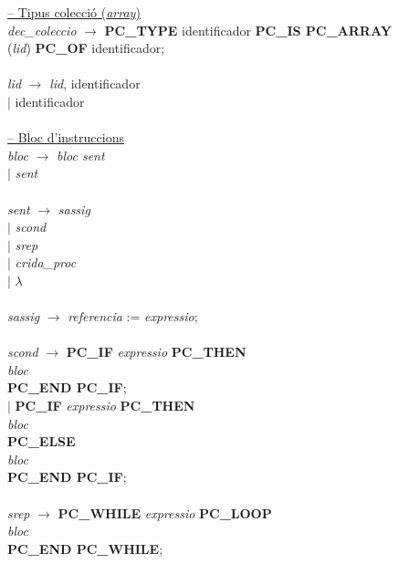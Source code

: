 \begin{tabbing}
        \underline{-- Tipus colecció (\textit{array})} \\
        \textit{dec\_coleccio} \> $\rightarrow$ \> \textbf{PC\_TYPE} identificador \textbf{PC\_IS PC\_ARRAY} \\
		\> (\textit{lid}) \textbf{PC\_OF} identificador; \\
        \\
        \textit{lid} \> $\rightarrow$ \> \textit{lid}, identificador \\
        \> $\mid$ \> identificador \\
        \\
        
        
        \underline{-- Bloc d'instruccions} \\
        \textit{bloc} \> $\rightarrow$ \> \textit{bloc sent} \\
        \> $\mid$ \> \textit{sent} \\
        \\
        \textit{sent} \> $\rightarrow$ \> \textit{sassig} \\
        \> $\mid$ \> \textit{scond} \\
        \> $\mid$ \> \textit{srep} \\
        \> $\mid$ \> \textit{crida\_proc} \\
		\> $\mid$ \> $\lambda$ \\
        \\
        
        \textit{sassig} \> $\rightarrow$ \> \textit{referencia} := \textit{expressio}; \\
        \\
        
        \textit{scond} \> $\rightarrow$ \> \textbf{PC\_IF} \textit{expressio} \textbf{PC\_THEN} \\
        \> \> \>  \textit{bloc} \\
        \> \> \textbf{PC\_END PC\_IF}; \\
        \> $\mid$ \> \textbf{PC\_IF} \textit{expressio} \textbf{PC\_THEN} \\
        \> \> \> \textit{bloc} \\
        \> \> \textbf{PC\_ELSE} \\
        \> \> \> \textit{bloc} \\
        \> \> \textbf{PC\_END PC\_IF}; \\
        \\
        
        \textit{srep} \> $\rightarrow$ \> \textbf{PC\_WHILE} \textit{expressio} \textbf{PC\_LOOP} \\
        \> \> \> \textit{bloc} \\
        \> \> \textbf{PC\_END PC\_WHILE}; \\
        \\
        

\end{tabbing}
